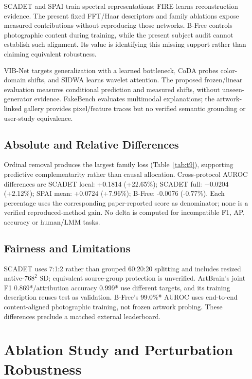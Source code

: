 \documentclass[journal,twoside,web]{IEEEtran}
\begin{document}
SCADET and SPAI train spectral representations; FIRE learns reconstruction evidence. The present fixed FFT/Haar descriptors and family ablations expose measured contributions without reproducing those networks. B-Free controls photographic content during training, while the present subject audit cannot establish such alignment. Its value is identifying this missing support rather than claiming equivalent robustness.

VIB-Net targets generalization with a learned bottleneck, CoDA probes color-domain shifts, and SIDWA learns wavelet attention. The proposed frozen/linear evaluation measures conditional prediction and measured shifts, without unseen-generator evidence. FakeBench evaluates multimodal explanations; the artwork-linked gallery provides pixel/feature traces but no verified semantic grounding or user-study equivalence. 

\subsection{Absolute and Relative Differences}

Ordinal removal produces the largest family loss (Table~\ref{tab:t9}), supporting predictive complementarity rather than causal allocation. Cross-protocol AUROC differences are SCADET local: +0.1814 (+22.65\%); SCADET full: +0.0204 (+2.12\%); SPAI mean: +0.0724 (+7.96\%); B-Free: -0.0076 (-0.77\%). Each percentage uses the corresponding paper-reported score as denominator; none is a verified reproduced-method gain. No delta is computed for incompatible F1, AP, accuracy or human/LMM tasks.

\subsection{Fairness and Limitations}
SCADET uses 7:1:2 rather than grouped 60:20:20 splitting and includes resized native-$768^2$ SD; equivalent source-group protection is unverified. ArtBrain's joint F1 0.869*/attribution accuracy 0.999* use different targets, and its training description reuses test as validation. B-Free's 99.0\%* AUROC uses end-to-end content-aligned photographic training, not frozen artwork probing. These differences preclude a matched external leaderboard.

\section{Ablation Study and Perturbation Robustness}
\end{document}
